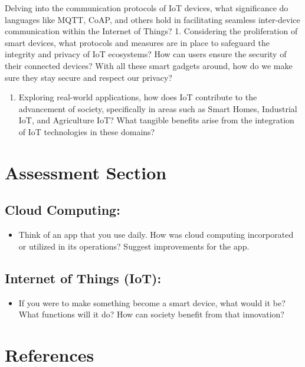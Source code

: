 \documentclass[
  letterpaper,
  DIV=11,
  numbers=noendperiod]{scrreprt}
\providecommand{\tightlist}{%
  \setlength{\itemsep}{0pt}\setlength{\parskip}{0pt}}\usepackage{longtable,booktabs,array}
\begin{document}
Delving into the communication protocols of IoT devices, what
significance do languages like MQTT, CoAP, and others hold in
facilitating seamless inter-device communication within the Internet of
Things? 1. Considering the proliferation of smart devices, what
protocols and measures are in place to safeguard the integrity and
privacy of IoT ecosystems? How can users ensure the security of their
connected devices? With all these smart gadgets around, how do we make
sure they stay secure and respect our privacy?

\begin{enumerate}
\def\labelenumi{\arabic{enumi}.}
\tightlist
\item
  Exploring real-world applications, how does IoT contribute to the
  advancement of society, specifically in areas such as Smart Homes,
  Industrial IoT, and Agriculture IoT? What tangible benefits arise from
  the integration of IoT technologies in these domains?
\end{enumerate}

\section{Assessment Section}\label{assessment-section}

\subsection{Cloud Computing:}\label{cloud-computing-2}

\begin{itemize}
\tightlist
\item
  Think of an app that you use daily. How was cloud computing
  incorporated or utilized in its operations? Suggest improvements for
  the app.
\end{itemize}

\subsection{Internet of Things (IoT):}\label{internet-of-things-iot-1}

\begin{itemize}
\tightlist
\item
  If you were to make something become a smart device, what would it be?
  What functions will it do? How can society benefit from that
  innovation?
\end{itemize}

\section{References}\label{references-4}
\end{document}
